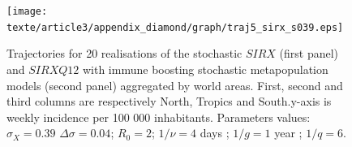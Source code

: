 \begin{figure}[!hp]
  \center
  \texttt{[image: texte/article3/appendix\_diamond/graph/traj5\_sirx\_s039.eps]}
  \caption{Trajectories for 20 realisations of the stochastic $SIRX$
    (first panel) and $SIRXQ12$ with immune boosting stochastic
    metapopulation models (second panel) aggregated by world
    areas. First, second and third columns are respectively North,
    Tropics and South.y-axis is weekly incidence per 100 000
    inhabitants. Parameters values: $\sigma_X=0.39$
    $\Delta\sigma=0.04$; $R_0=2$; $1/\nu=4$ days ; $1/g=1$ year ;
    $1/q=6$.}
  \label{fig:traj_sirx_s039}
\end{figure}


%
%



